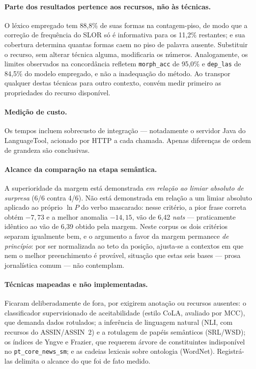 \documentclass[11pt,a4paper]{article}
\begin{document}
\paragraph{Parte dos resultados pertence aos recursos, não às técnicas.} O léxico empregado tem
88,8\% de suas formas na contagem-piso, de modo que a correção de frequência do SLOR só é
informativa para os 11,2\% restantes; e sua cobertura determina quantas formas caem no piso de
palavra ausente. Substituir o recurso, sem alterar técnica alguma, modificaria os números.
Analogamente, os limites observados na concordância refletem \texttt{morph\_acc} de 95,0\% e
\texttt{dep\_las} de 84,5\% do modelo empregado, e não a inadequação do método. Ao transpor
qualquer destas técnicas para outro contexto, convém medir primeiro as propriedades do recurso
disponível.

\paragraph{Medição de custo.} Os tempos incluem sobrecusto de integração --- notadamente o servidor
Java do LanguageTool, acionado por HTTP a cada chamada. Apenas diferenças de ordem de grandeza são
conclusivas.

\paragraph{Alcance da comparação na etapa semântica.} A superioridade da margem está demonstrada
\emph{em relação ao limiar absoluto de surpresa} (6/6 contra 4/6). Não está demonstrada em relação a
um limiar absoluto aplicado ao próprio $\ln P$ do verbo mascarado: nesse critério, a pior frase
correta obtém $-7{,}73$ e a melhor anomalia $-14{,}15$, vão de 6,42 \textit{nats} --- praticamente
idêntico ao vão de 6,39 obtido pela margem. Neste corpus os dois critérios separam igualmente bem, e
o argumento a favor da margem permanece \emph{de princípio}: por ser normalizada ao teto da posição,
ajusta-se a contextos em que nem o melhor preenchimento é provável, situação que estas seis bases ---
prosa jornalística comum --- não contemplam.

\paragraph{Técnicas mapeadas e não implementadas.} Ficaram deliberadamente de fora, por exigirem
anotação ou recursos ausentes: o classificador supervisionado de aceitabilidade (estilo CoLA,
avaliado por MCC), que demanda dados rotulados; a inferência de linguagem natural (NLI, com recursos
do ASSIN/ASSIN~2) e a rotulagem de papéis semânticos (SRL/WSD); os índices de Yngve e Frazier, que
requerem árvore de constituintes indisponível no \texttt{pt\_core\_news\_sm}; e as cadeias lexicais
sobre ontologia (WordNet). Registrá-las delimita o alcance do que foi de fato medido.
\end{document}
